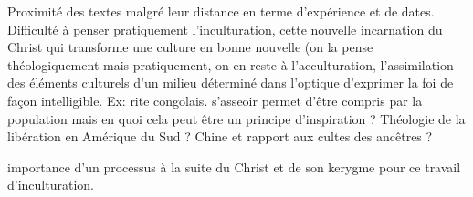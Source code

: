 \begin{Synthesis}
    Proximité des textes malgré leur distance en terme d'expérience et de dates. Difficulté à penser pratiquement l'inculturation, cette nouvelle incarnation du Christ qui transforme une culture en bonne nouvelle (on la pense théologiquement mais pratiquement, on en reste à l'acculturation, l'assimilation des éléments culturels d'un milieu déterminé dans l'optique d'exprimer la foi de façon intelligible. Ex: rite congolais. s'asseoir permet d'être compris par la population mais en quoi cela peut être un principe d'inspiration ? Théologie de la libération en Amérique du Sud ? Chine et rapport aux cultes des ancêtres ? 

    importance d'un processus à la suite du Christ et de son kerygme pour ce travail d'inculturation. 
\end{Synthesis}
